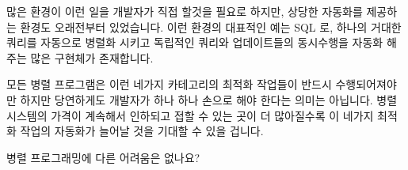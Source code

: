 많은 환경이 이런 일을 개발자가 직접 할것을 필요로 하지만, 상당한 자동화를
제공하는 환경도 오래전부터 있었습니다.
이런 환경의 대표적인 예는 SQL 로, 하나의 거대한 쿼리를 자동으로 병렬화 시키고
독립적인 쿼리와 업데이트들의 동시수행을 자동화 해주는 많은 구현체가 존재합니다.

모든 병렬 프로그램은 이런 네가지 카테고리의 최적화 작업들이 반드시
수행되어져야만 하지만 당연하게도 개발자가 하나 하나 손으로 해야 한다는 의미는
아닙니다.
병렬 시스템의 가격이 계속해서 인하되고 접할 수 있는 곳이 더 많아질수록 이
네가지 최적화 작업의 자동화가 늘어날 것을 기대할 수 있을 겁니다.

\QuickQuiz{}
	병렬 프로그래밍에 다른 어려움은 없나요?
	\iffalse

